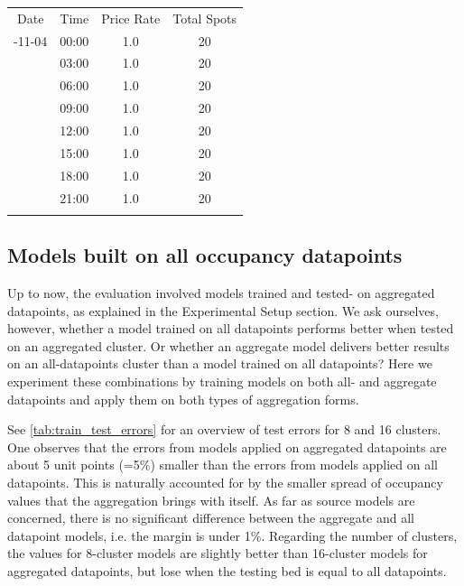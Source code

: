 \documentclass{ws-ijait}
\newcommand{\cmmnt}[1]{\ignorespaces}
\begin{document}
		\begin{table}
			{\begin{tabular}{cccc}	
					\toprule
					Date & Time & Price Rate & Total Spots \\
					\colrule
					2017-11-04 & 	00:00 & 1.0 & 20 \\
					& 	03:00 & 1.0 & 20 \\
					& 	06:00 & 1.0 & 20 \\
					& 	09:00 & 1.0 & 20 \\
					& 	12:00 & 1.0 & 20 \\
					& 	15:00 & 1.0 & 20 \\
					& 	18:00 & 1.0 & 20 \\
					& 	21:00 & 1.0 & 20 \\
					\botrule
			\end{tabular}}
			\label{tab:ml_cwout}
		\end{table}
					
		\subsection{Models built on all occupancy datapoints}
		Up to now, the evaluation involved models trained and tested- on aggregated datapoints, as explained in \cmmnt{\cref{experimental_setup:aggregating_training_data}} the Experimental Setup section. 
		We ask ourselves, however, whether a model trained on all datapoints performs better when tested on an aggregated cluster. Or whether an aggregate model delivers better results on an all-datapoints cluster than a model trained on all datapoints? Here we experiment these combinations by training models on both all- and aggregate datapoints and apply them on both types of aggregation forms. 
		
		See \cref{tab:train_test_errors} for an overview of test errors for 8 and 16 clusters. One observes that the errors from models applied on aggregated datapoints are about 5 unit points (=5\%) smaller than the errors from models applied on all datapoints. This is naturally accounted for by the smaller spread of occupancy values that the aggregation brings with itself. As far as source models are concerned, there is no significant difference between the aggregate and all datapoint models, i.e. the margin is under 1\%. Regarding the number of clusters, the values for 8-cluster models are slightly better than 16-cluster models for aggregated datapoints, but lose when the testing bed is equal to all datapoints.
		
\end{document}
